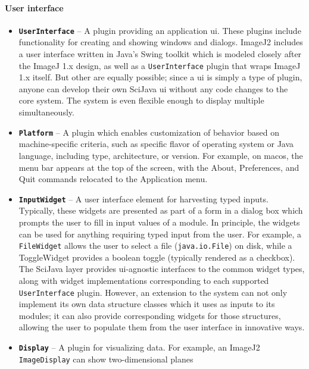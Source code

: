 \documentclass{bmcart}
\begin{document}
\paragraph*{User interface}
\begin{itemize}
  \item \textbf{\texttt{UserInterface}} -- A plugin providing an application
    \acrshort{ui}. These plugins include functionality for creating and showing
    windows and dialogs. ImageJ2 includes a user interface written in Java's
    Swing toolkit which is modeled closely after the ImageJ 1.x design, as well
    as a \texttt{UserInterface} plugin that wraps ImageJ 1.x itself. But other
     are equally possible; since a \acrshort{ui} is simply a
    type of plugin, anyone can develop their own SciJava \acrshort{ui} without
    any code changes to the core system. The system is even flexible enough to
    display multiple  simultaneously.
  \item \textbf{\texttt{Platform}} -- A plugin which enables customization of
    behavior based on machine-specific criteria, such as specific flavor of
    operating system or Java language, including type, architecture, or
    version. For example, on \acrfull{macos}, the menu bar appears at the top
    of the screen, with the About, Preferences, and Quit commands relocated to
    the Application menu.
  \item \textbf{\texttt{InputWidget}} -- A user interface element for
    harvesting typed inputs. Typically, these widgets are presented as part of
    a form in a dialog box which prompts the user to fill in input values of a
    module. In principle, the widgets can be used for anything requiring typed
    input from the user. For example, a \texttt{FileWidget} allows the user to
    select a file (\texttt{java.io.File}) on disk, while a ToggleWidget
    provides a boolean toggle (typically rendered as a checkbox). The SciJava
    layer provides \acrshort{ui}-agnostic interfaces to the common widget
    types, along with widget implementations corresponding to each supported
    \texttt{UserInterface} plugin. However, an extension to the system can not
    only implement its own data structure classes which it uses as inputs to
    its modules; it can also provide corresponding widgets for those
    structures, allowing the user to populate them from the user interface in
    innovative ways.
  \item \textbf{\texttt{Display}} -- A plugin for visualizing data. For
    example, an ImageJ2 \texttt{ImageDisplay} can show two-dimensional planes

\end{itemize}
\end{document}
